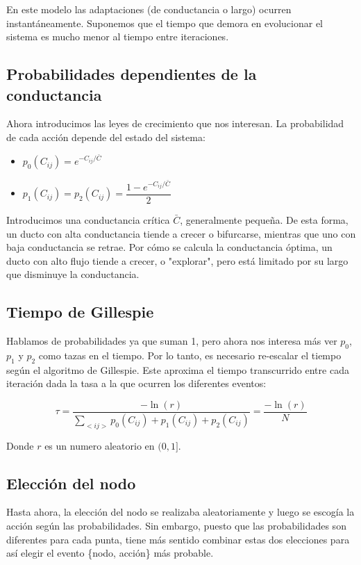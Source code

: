 \documentclass{article}
\begin{document}
En este modelo las adaptaciones (de conductancia o largo) ocurren instantáneamente. Suponemos que el tiempo que demora en evolucionar el sistema es mucho menor
al tiempo entre iteraciones.

\subsection{Probabilidades dependientes de la conductancia}

Ahora introducimos las leyes de crecimiento que nos interesan. La probabilidad de cada acción depende del estado del sistema:

\begin{itemize}
    \item $p_0(C_{ij}) = e^{-C_{ij}/\bar{C}}$
    \item $p_1(C_{ij}) = p_2(C_{ij}) = \dfrac{1 - e^{-C_{ij}/\bar{C}}}{2}$
\end{itemize}

Introducimos una conductancia crítica $\bar{C}$, generalmente pequeña. De esta forma, un ducto con alta conductancia tiende a crecer o bifurcarse, mientras que uno con baja conductancia se retrae. 
Por cómo se calcula la conductancia óptima, un ducto con alto flujo tiende a crecer, o "explorar", pero está limitado por su largo que disminuye la conductancia.

\subsection{Tiempo de Gillespie}

Hablamos de probabilidades ya que suman 1, pero ahora nos interesa más ver $p_0$, $p_1$ y $p_2$ como tazas en el tiempo. Por lo tanto, es necesario re-escalar el tiempo según el algoritmo de Gillespie.
Este aproxima el tiempo transcurrido entre cada iteración dada la tasa a la que ocurren los diferentes eventos:

$$ \tau = \frac{-\ln(r)}{\sum_{<ij>}p_0(C_{ij}) + p_1(C_{ij}) + p_2(C_{ij})} = \frac{-\ln(r)}{N}$$

Donde $r$ es un numero aleatorio en $(0,1]$.

\subsection{Elección del nodo}

Hasta ahora, la elección del nodo se realizaba aleatoriamente y luego se escogía la acción según las probabilidades. Sin embargo, puesto que las probabilidades son diferentes para cada punta, tiene más sentido combinar estas dos elecciones para así elegir el evento \{nodo, acción\}
más probable.
\end{document}
